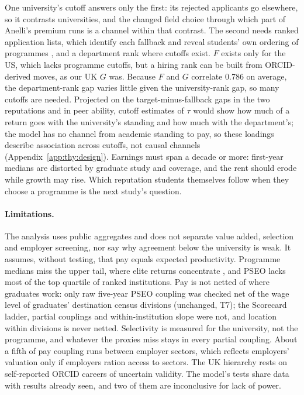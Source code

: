 \documentclass[11pt]{article}
\begin{document}
One university's cutoff answers only the first: its rejected applicants go elsewhere, so it contrasts universities,
and the changed field choice through which part of Anelli's premium runs is a channel within that contrast. The
second needs ranked application lists, which identify each fallback \citep{kirkeboen2016field} and reveal students'
own ordering of programmes \citep{avery2013revealed}, and a department rank where cutoffs exist. $F$ exists only for
the US, which lacks programme cutoffs, but a hiring rank can be built from ORCID-derived moves, as our UK $G$ was.
Because $F$ and $G$ correlate 0.786 on average, the department-rank gap varies little given the university-rank gap,
so many cutoffs are needed. Projected on the target-minus-fallback gaps in the two reputations and in peer ability,
cutoff estimates of $\tau$ would show how much of a return goes with the university's standing and how much with the
department's; the model has no channel from academic standing to pay, so these loadings describe association across
cutoffs, not causal channels (Appendix~\ref{app:thy:design}). Earnings must span a decade or more: first-year medians
are distorted by graduate study and coverage, and the rent should erode while growth may rise. Which reputation
students themselves follow when they choose a programme is the next study's question.

\paragraph{Limitations.} The analysis uses public aggregates and does not separate value added, selection and
employer screening, nor say why agreement below the university is weak. It assumes, without testing, that pay equals
expected productivity. Programme medians miss the upper tail, where elite returns concentrate
\citep{zimmerman2019elite, chetty2023diversifying}, and PSEO lacks most of the top quartile of ranked institutions.
Pay is not netted of where graduates work: only raw five-year PSEO coupling was checked net of the wage level of
graduates' destination census divisions (unchanged, T7); the Scorecard ladder, partial couplings and
within-institution slope were not, and location within divisions is never netted. Selectivity is measured for the
university, not the programme, and whatever the proxies miss stays in every partial coupling. About a fifth of pay
coupling runs between employer sectors, which reflects employers' valuation only if employers ration access to
sectors. The UK hierarchy rests on self-reported ORCID careers of uncertain validity. The model's tests share data
with results already seen, and two of them are inconclusive for lack of power.




\clearpage
\appendix

\end{document}
